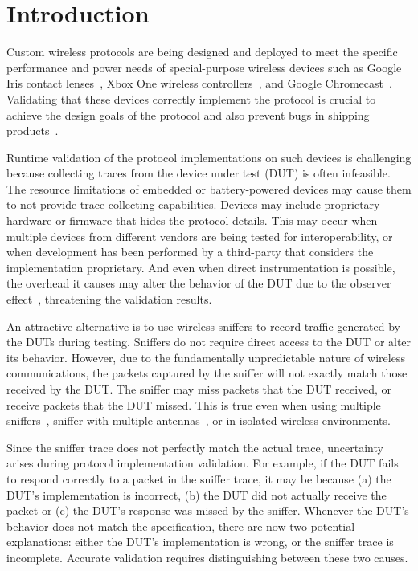 
\section{Introduction}
\label{sec:intro}

Custom wireless protocols are being designed and deployed to meet the specific
performance and power needs of special-purpose wireless devices such as Google
Iris contact lenses~\cite{iris}, Xbox One wireless controllers~\cite{xbox}, and
Google Chromecast~\cite{chromecast}.  Validating that these devices correctly
implement the protocol is crucial to achieve the design goals of the protocol
and also prevent bugs in shipping products~\cite{wifried,lollipop,surface}.


Runtime validation of the protocol implementations on such devices is
challenging because collecting traces from the device under test (DUT) is often
infeasible.  The resource limitations of embedded or battery-powered devices may
cause them to not provide trace collecting capabilities. Devices may include
proprietary hardware or firmware that hides the protocol details. This may occur
when multiple devices from different vendors are being tested for
interoperability, or when development has been performed by a third-party that
considers the implementation proprietary.  And even when direct instrumentation
is possible, the overhead it causes may alter the behavior of the DUT due to the
observer effect~\cite{mytkowicz2008observer}, threatening the validation
results.

An attractive alternative is to use wireless
sniffers to record traffic generated by the DUTs during testing.
Sniffers do not require direct access to the DUT or alter its behavior.
However, due to the fundamentally unpredictable nature of wireless
communications, the packets captured by the sniffer will not exactly match
those received by the DUT.
The sniffer may miss packets that the DUT received, or receive packets that
the DUT missed.
This is true even when using multiple
sniffers~\cite{cheng2006jigsaw,mahajan2006analyzing,bahl2006enhancing}, sniffer
with multiple antennas~\cite{omnipeek}, or in isolated wireless environments.

Since the sniffer trace does not perfectly match the actual trace,
uncertainty arises during protocol implementation validation.
For example, if the DUT fails to respond correctly to a packet in the sniffer
trace, it may be because (a) the DUT's implementation is incorrect, (b) the DUT
did not actually receive the packet or (c) the DUT's response was missed by the
sniffer.
Whenever the DUT's behavior does not match the specification, there are now two
potential explanations:
either the DUT's implementation is wrong, or the sniffer trace is incomplete.
Accurate validation requires  distinguishing between these two
causes.

